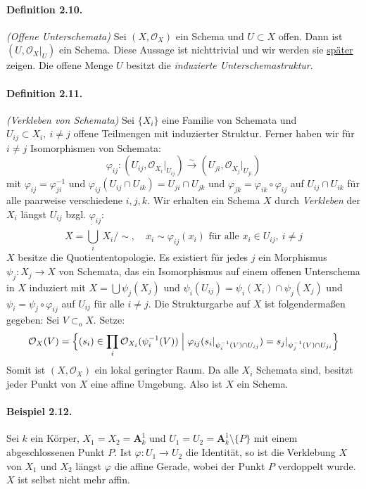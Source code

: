 \documentclass[11pt,b5paper,openany]{memoir}
\begin{document}
\paragraph{Definition 2.10.}\label{2.10} \textit{(Offene Unterschemata)} Sei $(X,\mathcal{O}_X)$ ein Schema und $U\subset X$ offen. Dann ist $(U,\mathcal{O}_X|_U)$ ein Schema. Diese Aussage ist nichttrivial und wir werden sie \hyperref[2.10-beweis]{später} zeigen. Die offene Menge $U$ besitzt die \textit{induzierte Unterschemastruktur}.

\paragraph{Definition 2.11.}\label{2.11} \textit{(Verkleben von Schemata)} Sei $\{X_i\}$ eine Familie von Schemata und $U_{ij}\subset X_i,\ i\neq j$ offene Teilmengen mit induzierter Struktur. Ferner haben wir für  $i\neq j$ Isomorphismen von Schemata:
\[\varphi_{ij}: (U_{ij},\mathcal{O}_{X_i}|_{U_{ij}}) \stackrel{\sim}{\to} (U_{ji},\mathcal{O}_{X_j}|_{U_{ji}}) \]
mit $\varphi_{ij}=\varphi_{ji}^{-1}$ und $\varphi_{ij}(U_{ij}\cap U_{ik})=U_{ji}\cap U_{jk}$ und $\varphi_{jk}=\varphi_{ik}\circ\varphi_{ij}$ auf $U_{ij}\cap U_{ik}$ für alle paar\-wei\-se verschiedene $i,j,k$. Wir erhalten ein Schema $X$ durch \textit{Verkleben} der $X_i$ längst $U_{ij}$ bzgl. $\varphi_{ij}$:
\[X=\dot{\bigcup_i}\ X_i\Big/{\sim},\quad x_i\sim\varphi_{ij}(x_i)\text{ für alle }x_i\in U_{ij},\ i\neq j \]
$X$ besitze die Quotiententopologie. Es existiert für jedes $j$ ein Morphismus $\psi_j:X_j\to X$ von Schemata, das ein Isomorphismus auf einem offenen Unterschema in $X$ induziert mit $X=\bigcup\psi_j(X_j)$ und $\psi_i(U_{ij})=\psi_i(X_i)\cap \psi_j(X_j)$ und $\psi_i=\psi_j\circ\varphi_{ij}$ auf $U_{ij}$ für alle $i\neq j$. Die Strukturgarbe auf $X$ ist folgendermaßen gegeben: Sei $V\subset_\text{o} X$. Setze:
\[\mathcal{O}_X(V)=\Big\{ (s_i)\in\prod_i \mathcal{O}_{X_i}(\psi_i^{-1}(V))\Bigm| \varphi_{ij}(s_i|_{\psi_i^{-1}(V)\cap U_{ij}}) = s_j|_{\psi_j^{-1}(V)\cap U_{ji}} \Big\} \]
Somit ist $(X,\mathcal{O}_X)$ ein lokal geringter Raum. Da alle $X_i$ Schemata sind, besitzt jeder Punkt von $X$ eine affine Umgebung. Also ist $X$ ein Schema.

\paragraph{Beispiel 2.12.}\label{2.12} Sei $k$ ein Körper, $X_1=X_2=\mathbf{A}_k^1$ und $U_1=U_2=\mathbf{A}_k^1\setminus\{P\}$ mit einem abgeschlossenen Punkt $P$. Ist $\varphi:U_1\to U_2$ die Identität, so ist die Verklebung $X$ von $X_1$ und $X_2$ längst $\varphi$ die affine Gerade, wobei der Punkt $P$ verdoppelt wurde. $X$ ist selbst nicht mehr affin.
\end{document}
